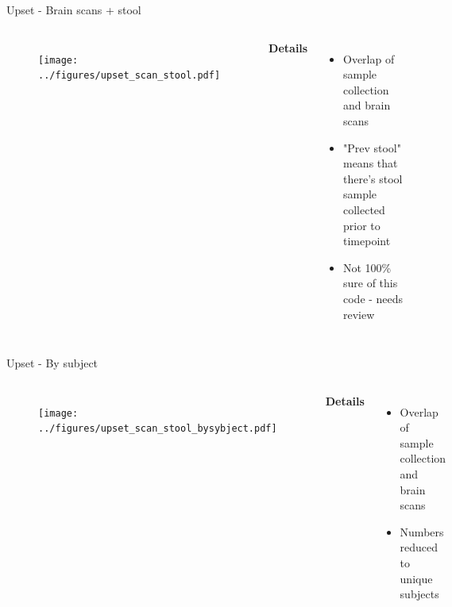 \begin{frame}{Upset - Brain scans + stool}
    \begin{columns}[c] %

    
        \begin{figure}
        \texttt{[image: ../figures/upset\_scan\_stool.pdf]}
        \end{figure}

    
        \textbf{Details}
        \begin{itemize}
            \item Overlap of sample collection and brain scans
            \item "Prev stool" means that there's stool sample collected prior to timepoint
            \item Not 100\% sure of this code - needs review
        \end{itemize}

    \end{columns}

\end{frame}


\begin{frame}{Upset - By subject}
    \begin{columns}[c] %

    
        \begin{figure}
        \texttt{[image: ../figures/upset\_scan\_stool\_bysybject.pdf]}
        \end{figure}

    
        \textbf{Details}
        \begin{itemize}
            \item Overlap of sample collection and brain scans
            \item Numbers reduced to unique subjects
        \end{itemize}

    \end{columns}

\end{frame}

